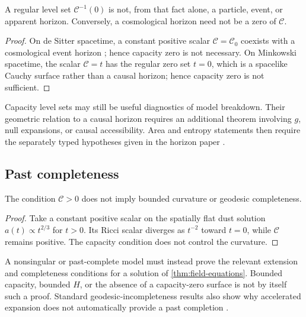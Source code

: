 \documentclass[11pt]{article}
\newcommand{\CC}{\mathcal C}
\begin{document}
\begin{proposition}
\label{prop:horizon-separation}
A regular level set $\CC^{-1}(0)$ is not, from that fact alone, a
particle, event, or apparent horizon.  Conversely, a cosmological horizon
need not be a zero of $\CC$.
\end{proposition}

\begin{proof}
On de Sitter spacetime, a constant positive scalar $\CC=\CC_0$ coexists
with a cosmological event horizon \cite{gibbons_hawking_1977}; hence
capacity zero is not necessary.  On Minkowski spacetime, the scalar
$\CC=t$ has the regular zero set $t=0$, which is a spacelike Cauchy
surface rather than a causal horizon; hence capacity zero is not
sufficient.
\end{proof}

Capacity level sets may still be useful diagnostics of model breakdown.
Their geometric relation to a causal horizon requires an additional
theorem involving $g$, null expansions, or causal accessibility.  Area
and entropy statements then require the separately typed hypotheses
given in the horizon paper \cite{nero_horizons_2026}.

\subsection{Past completeness}

\begin{proposition}
\label{prop:singularity-separation}
The condition $\CC>0$ does not imply bounded curvature or geodesic
completeness.
\end{proposition}

\begin{proof}
Take a constant positive scalar on the spatially flat dust solution
$a(t)\propto t^{2/3}$ for $t>0$.  Its Ricci scalar diverges as
$t^{-2}$ toward $t=0$, while $\CC$ remains positive.  The capacity
condition does not control the curvature.
\end{proof}

A nonsingular or past-complete model must instead prove the relevant
extension and completeness conditions for a solution of
\cref{thm:field-equations}.  Bounded capacity, bounded $H$, or the absence
of a capacity-zero surface is not by itself such a proof.  Standard
geodesic-incompleteness results also show why accelerated expansion does
not automatically provide a past completion
\cite{borde_guth_vilenkin_2003}.
\end{document}
